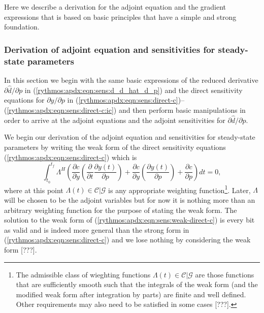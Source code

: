 \documentclass[pdf,ps2pdf,11pt]{SANDreport}
\begin{document}
Here we describe a derivation for the adjoint equation and the gradient
expressions that is based on basic principles that have a simple and strong
foundation.

\subsubsection{Derivation of adjoint equation and sensitivities for steady-state parameters}

In this section we begin with the same basic expressions of the reduced
derivative ${}\partial {}\hat{d} / {}\partial p$ in
(\ref{rythmos:apdx:eqn:sens:d_d_hat_d_p}) and the direct sensitivity equations
for ${}\partial y / {}\partial p$ in
(\ref{rythmos:apdx:eqn:sens:direct-c})--(\ref{rythmos:apdx:eqn:sens:direct-c:ic})
and then perform basic manipulations in order to arrive at the adjoint
equations and the adjoint sensitivities for ${}\partial {}\hat{d} /
{}\partial p$.

We begin our derivation of the adjoint equation and sensitivities for
steady-state parameters by writing the weak form of the direct sensitivity
equations (\ref{rythmos:apdx:eqn:sens:direct-c}) which is
%
\begin{equation}
\int_{t_0}^{t_f} \Lambda^H \left(
\frac{\partial c}{\partial \dot{y}} \left(\frac{\partial}{\partial t} \frac{\partial y(t)}{\partial p} \right)
+ \frac{\partial c}{\partial y} \left(\frac{\partial y(t)}{\partial p}\right)
+ \frac{\partial c}{\partial p}
\right) dt = 0,
\label{rythmos:apdx:eqn:sens:weak-direct-c}
\end{equation}
%
where at this point $\Lambda(t)\in\mathcal{C}|\mathcal{G}$ is any
appropriate weighting function\footnote{The admissible class of
wieghting functions $\Lambda(t)\in\mathcal{C}|\mathcal{G}$ are those
functions that are sufficiently smooth such that the integrals of the
weak form (and the modified weak form after integration by parts) are
finite and well defined.  Other requirements may also need to be
satisfied in some cases [???].}.  Later, $\Lambda$ will be chosen to
be the adjoint variables but for now it is nothing more than an
arbitrary weighting function for the purpose of stating the weak form.
The solution to the weak form of
(\ref{rythmos:apdx:eqn:sens:weak-direct-c}) is every bit as valid and
is indeed more general than the strong form in
(\ref{rythmos:apdx:eqn:sens:direct-c}) and we lose nothing by
considering the weak form [???].
\end{document}
